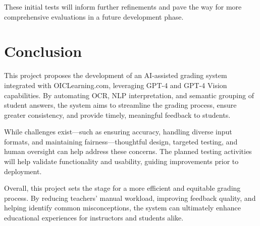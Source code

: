 \documentclass[ms,twoside,print]{nuthesis}
\begin{document}
These initial tests will inform further refinements and pave the way for more comprehensive evaluations in a future development phase.

\chapter{Conclusion}

This project proposes the development of an AI-assisted grading system integrated with OICLearning.com, leveraging GPT-4 and GPT-4 Vision capabilities. By automating OCR, NLP interpretation, and semantic grouping of student answers, the system aims to streamline the grading process, ensure greater consistency, and provide timely, meaningful feedback to students.

While challenges exist—such as ensuring accuracy, handling diverse input formats, and maintaining fairness—thoughtful design, targeted testing, and human oversight can help address these concerns. The planned testing activities will help validate functionality and usability, guiding improvements prior to deployment.

Overall, this project sets the stage for a more efficient and equitable grading process. By reducing teachers’ manual workload, improving feedback quality, and helping identify common misconceptions, the system can ultimately enhance educational experiences for instructors and students alike.



\end{document}
